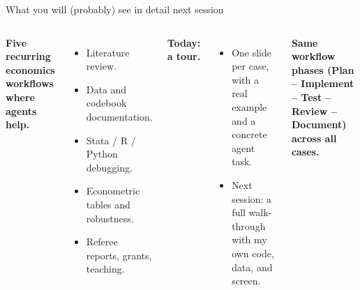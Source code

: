 

\begin{frame}{What you will (probably) see in detail next session}
  \begin{columns}[T,onlytextwidth]
      \textbf{Five recurring economics workflows where agents help.}
      \begin{itemize}\setlength\itemsep{0.3em}
        \item Literature review.
        \item Data and codebook documentation.
        \item Stata / R / Python debugging.
        \item Econometric tables and robustness.
        \item Referee reports, grants, teaching.
      \end{itemize}
      \textbf{Today: a tour.}
      \begin{itemize}\setlength\itemsep{0.3em}
        \item One slide per case, with a real example and a concrete agent task.
        \item Next session: a full walk-through with my own code, data, and screen.
      \end{itemize}
      \vspace{0.3cm}
      \begin{center}\small\color{accent}\bfseries Same workflow phases (Plan -- Implement -- Test -- Review -- Document) across all cases.\end{center}
  \end{columns}
\end{frame}

